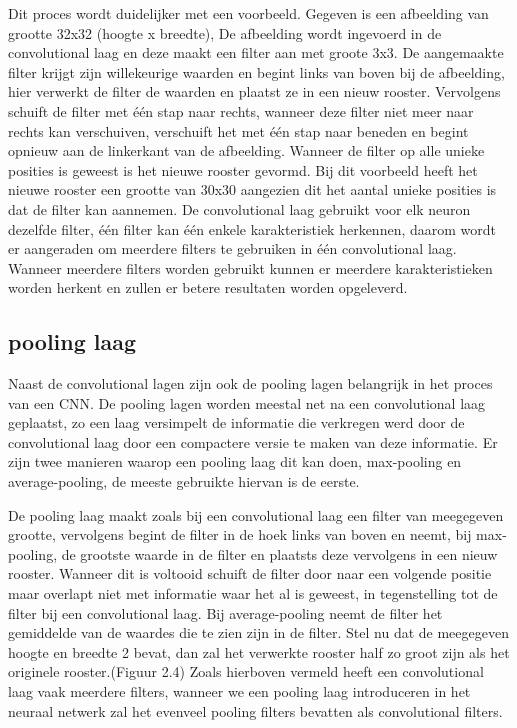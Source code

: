 Dit proces wordt duidelijker met een voorbeeld.
Gegeven is een afbeelding van grootte 32x32 (hoogte x breedte),
De afbeelding wordt ingevoerd in de convolutional laag en deze maakt een filter aan met groote 3x3.
De aangemaakte filter krijgt zijn willekeurige waarden en begint links van boven bij de afbeelding, hier verwerkt de filter de waarden en plaatst ze in een nieuw rooster. 
Vervolgens schuift de filter met één stap naar rechts, wanneer deze filter niet meer naar rechts kan verschuiven, verschuift het met één stap naar beneden en begint opnieuw aan de linkerkant van de afbeelding.
Wanneer de filter op alle unieke posities is geweest is het nieuwe rooster gevormd. Bij dit voorbeeld heeft het nieuwe rooster een grootte van 30x30 aangezien dit het aantal unieke posities is dat de filter kan aannemen.
De convolutional laag gebruikt voor elk neuron dezelfde filter, één filter kan één enkele karakteristiek herkennen, daarom wordt er aangeraden om meerdere filters te gebruiken in één convolutional laag.
Wanneer meerdere filters worden gebruikt kunnen er meerdere karakteristieken worden herkent en zullen er betere resultaten worden opgeleverd.



\subsection{pooling laag}

Naast de convolutional lagen zijn ook de pooling lagen belangrijk in het proces van een CNN.
De pooling lagen worden meestal net na een convolutional laag geplaatst, zo een laag versimpelt de informatie die verkregen werd door de convolutional laag door een compactere versie te maken van deze informatie.
Er zijn twee manieren waarop een pooling laag dit kan doen, max-pooling en average-pooling, de meeste gebruikte hiervan is de eerste.

De pooling laag maakt zoals bij een convolutional laag een filter van meegegeven grootte, vervolgens begint de filter in de hoek links van boven en neemt, bij max-pooling, de grootste waarde in de filter en plaatsts deze vervolgens in een nieuw rooster. Wanneer dit is voltooid schuift de filter door naar een volgende positie maar overlapt niet met informatie waar het al is geweest, in tegenstelling tot de filter bij een convolutional laag.
Bij average-pooling neemt de filter het gemiddelde van de waardes die te zien zijn in de filter.
Stel nu dat de meegegeven hoogte en breedte 2 bevat, dan zal het verwerkte rooster half zo groot zijn als het originele rooster.(Figuur 2.4)
Zoals hierboven vermeld heeft een convolutional laag vaak meerdere filters, wanneer we een pooling laag introduceren in het neuraal netwerk zal het evenveel pooling filters bevatten als convolutional filters.

